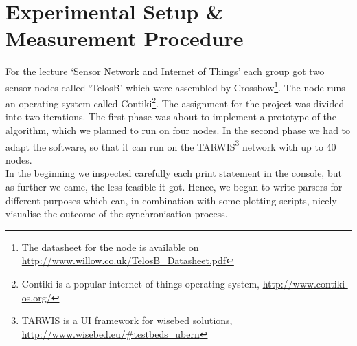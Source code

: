 \documentclass{llncs}
\begin{document}
\section{Experimental Setup \& Measurement Procedure}
For the lecture `Sensor Network and Internet of Things' each group got two sensor nodes called `TelosB' which were assembled by Crossbow\footnote{The datasheet for the node is available on \url{http://www.willow.co.uk/TelosB_Datasheet.pdf}}. The node runs an operating system called Contiki\footnote{Contiki is a popular internet of things operating system, \url{http://www.contiki-os.org/}}. The assignment for the project was divided into two iterations. The first phase was about to implement a prototype of the algorithm, which we planned to run on four nodes. In the second phase we had to adapt the software, so that it can run on the TARWIS\footnote{TARWIS is a UI framework for wisebed solutions, \url{http://www.wisebed.eu/\#testbeds_ubern}} network with up to 40 nodes.\\
\indent In the beginning we inspected carefully each print statement in the console, but as further we came, the less feasible it got. Hence, we began to write parsers for different purposes which can, in combination with some plotting scripts, nicely visualise the outcome of the synchronisation process.
\end{document}
